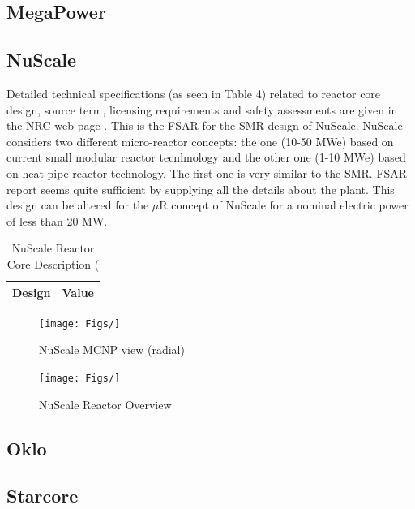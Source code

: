 \documentclass[10pt,a4paper]{article}
\begin{document}
\subsection{MegaPower}

\subsection{NuScale}
Detailed technical specifications (as seen in Table 4) related to reactor core design, source term, licensing requirements and safety assessments are given in the NRC web-page \cite{NuScale18}. This is the FSAR for the SMR design of NuScale. NuScale considers two different micro-reactor concepts: the one (10-50 MWe) based on current small modular reactor tecnhnology and the other one (1-10 MWe) based on heat pipe reactor technology. The first one is very similar to the SMR. FSAR report  seems quite sufficient by supplying all the details about the plant. This design can be altered for the $\mu$R concept of NuScale for a nominal electric power of less than 20 MW.

\begin{table} [ht]
\begin{center}

\caption{NuScale Reactor Core Description (\cite{NuScale18}}
\begin{tabular}{|l|l|}
\hline 
Design 		&Value \\ 
\hline 

\end{tabular}
\end{center}
\end{table}

\begin{figure}[hbtp]
\centering
\texttt{[image: Figs/]}
\caption{NuScale MCNP view (radial)}
\end{figure}

\begin{figure}[hbtp]
\centering
\texttt{[image: Figs/]}
\caption{NuScale Reactor Overview}
\end{figure}

\subsection{Oklo}

\subsection{Starcore}
\end{document}
